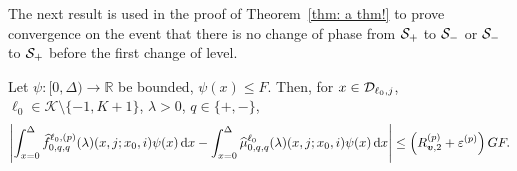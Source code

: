  The next result is used in the proof of Theorem~\ref{thm: a thm!} to prove convergence on the event that there is no change of phase from \(\mathcal{S}_+\) to \(\mathcal{S}_-\) or \(\mathcal{S}_-\) to \(\mathcal{S}_+\) before the first change of level. 
 \begin{lem}\label{lem: Dcoajc}
	Let \(\psi:[0,\Delta)\to \mathbb R\) be bounded, \(\psi(x)\leq F\). Then, for \(x\in\mathcal{D}_{\ell_0,j}\), \(\ell_0\in\mathcal K\setminus\{-1,K+1\}\), \(\lambda > 0\), \(q\in\{+,-\}\), 
	\begin{align}
		\left|\int_{x=0}^\Delta \widehat f^{\ell_0,(p)}_{0,q,q}(\lambda)(x,j; x_0,i)\psi(x)\, \mathrm{d} x - \int_{x=0}^\Delta\widehat \mu^{\ell_0}_{0,q,q}(\lambda)(x,j; x_0,i)\psi(x)\, \mathrm{d} x\right| \leq \left(R_{{\boldsymbol v},2}^{(p)} + \varepsilon^{(p)}\right) GF.
		\label{eqn: anue}
	\end{align} 
\end{lem}
